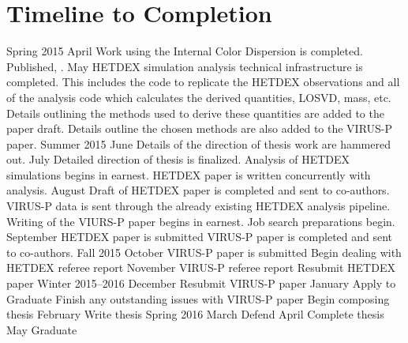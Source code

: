 \documentclass[12pt]{article}
\begin{document}
\section{Timeline to Completion}
\begin{outline}[enumerate]
	\1 Spring 2015
		\2 April
			\3 Work using the Internal Color Dispersion is completed. Published, \cite{Boada2015}.
		\2 May
			\3 HETDEX simulation analysis technical infrastructure is completed. This includes the code to replicate the HETDEX observations and all of the analysis code which calculates the derived quantities, LOSVD, mass, etc. 
			\3 Details outlining the methods used to derive these quantities are added to the paper draft. 
			\3 Details outline the chosen methods are also added to the VIRUS-P paper. 
	\1 Summer 2015
		\2 June
			\3 Details of the direction of thesis work are hammered out.
		\2 July
			\3 Detailed direction of thesis is finalized. 
			\3 Analysis of HETDEX simulations begins in earnest.
			\3 HETDEX paper is written concurrently with analysis.
		\2 August
			\3 Draft of HETDEX paper is completed and sent to co-authors.
			\3 VIRUS-P data is sent through the already existing HETDEX analysis pipeline.
			\3 Writing of the VIURS-P paper begins in earnest.
			\3 Job search preparations begin.
		\2 September
			\3 HETDEX paper is submitted
			\3 VIRUS-P paper is completed and sent to co-authors.
	\1 Fall 2015
		\2 October
			\3 VIRUS-P paper is submitted
			\3 Begin dealing with HETDEX referee report
		\2 November
			\3 VIRUS-P referee report
			\3 Resubmit HETDEX paper
	\1 Winter 2015--2016
		\2 December
			\3 Resubmit VIRUS-P paper
		\2 January
			\3 Apply to Graduate
			\3 Finish any outstanding issues with VIRUS-P paper
			\3 Begin composing thesis
		\2 February
			\3 Write thesis
	\1 Spring 2016
		\2 March
			\3 Defend
		\2 April
			\3 Complete thesis
		\2 May
			\3 Graduate
\end{outline}

\end{document}
